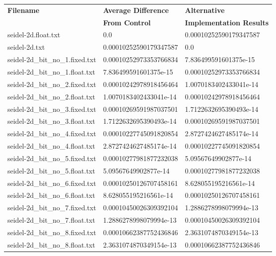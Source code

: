 \begin{longtable}
\caption{Injection results}
\centering
\begin{tabular}{lll}
{\bf Filename} & {\bf Average Difference} & {\bf Alternative } \\
             & {\bf From Control }      & {\bf Implementation Results}\\
 
    seidel-2d.float.txt & 0.0   & 0.00010252590179347587 \\
    seidel-2d.txt & 0.00010252590179347587 & 0.0 \\
    seidel-2d\_bit\_no\_1.fixed.txt & 0.00010252973353766834 & 7.836499591601375e-15 \\
    seidel-2d\_bit\_no\_1.float.txt & 7.836499591601375e-15 & 0.00010252973353766834 \\
    seidel-2d\_bit\_no\_2.fixed.txt & 0.00010242978918456464 & 1.0070183402433041e-14 \\
    seidel-2d\_bit\_no\_2.float.txt & 1.0070183402433041e-14 & 0.00010242978918456464 \\
    seidel-2d\_bit\_no\_3.fixed.txt & 0.00010269591987037501 & 1.7122632695390493e-14 \\
    seidel-2d\_bit\_no\_3.float.txt & 1.7122632695390493e-14 & 0.00010269591987037501 \\
    seidel-2d\_bit\_no\_4.fixed.txt & 0.00010227745091820854 & 2.8727424627485174e-14 \\
    seidel-2d\_bit\_no\_4.float.txt & 2.8727424627485174e-14 & 0.00010227745091820854 \\
    seidel-2d\_bit\_no\_5.fixed.txt & 0.00010277981877232038 & 5.09567649902877e-14 \\
    seidel-2d\_bit\_no\_5.float.txt & 5.09567649902877e-14 & 0.00010277981877232038 \\
    seidel-2d\_bit\_no\_6.fixed.txt & 0.00010250126707458161 & 8.628055195216561e-14 \\
    seidel-2d\_bit\_no\_6.float.txt & 8.628055195216561e-14 & 0.00010250126707458161 \\
    seidel-2d\_bit\_no\_7.fixed.txt & 0.00010450026309392104 & 1.2886278998079994e-13 \\
    seidel-2d\_bit\_no\_7.float.txt & 1.2886278998079994e-13 & 0.00010450026309392104 \\
    seidel-2d\_bit\_no\_8.fixed.txt & 0.00010662387752436846 & 2.3631074870349154e-13 \\
    seidel-2d\_bit\_no\_8.float.txt & 2.3631074870349154e-13 & 0.00010662387752436846 \\

\end{tabular}
\end{longtable}
